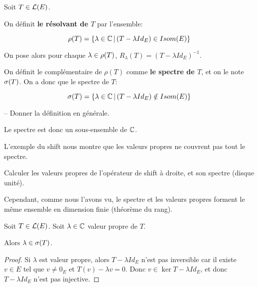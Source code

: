 \begin{definition}
	Soit $T \in \mathcal{L}(E)$.

	On définit \textbf{le résolvant de $T$} par l'ensemble:

	\begin{equation}
		\rho(T) = \left\{\lambda \in \mathbb{C} \, | \, (T - \lambda
			{Id}_{E}) \in Isom(E) \right\}
			\label{def:resolvant_operator}
	\end{equation}

	On pose alors pour chaque $\lambda \in \rho(T)$, $R_{\lambda}(T) = (T -
	\lambda Id_{E})^{-1}$.

	On définit le complémentaire de $\rho(T)$ comme \textbf{le spectre de $T$},
	et on le note $\sigma(T)$.
	On a donc que le spectre de $T$:

	\begin{equation}
		\sigma(T) = \left\{\lambda \in \mathbb{C} \, | \, (T - \lambda {Id}_{E})
		\notin Isom(E) \right\}
		\label{def:spectrum_operator}
	\end{equation}
\end{definition}

-- Donner la définition en générale.

Le spectre est donc un sous-ensemble de $\mathbb{C}$.

L'exemple du shift nous montre que les valeurs propres ne couvrent pas tout le
spectre.

\begin{exercice}
	Calculer les valeurs propres de l'opérateur de shift à droite, et son
	spectre (disque unité).
\end{exercice}

Cependant, comme nous l'avons vu, le spectre et les valeurs propres forment le
même ensemble en dimension finie (théorème du rang).

\begin{proposition}
	Soit $T \in \mathcal{L}(E)$.
	Soit $\lambda \in \mathbb{C}$ valeur propre de $T$.

	Alors $\lambda \in \sigma(T)$.
\end{proposition}

\begin{proof}
	Si $\lambda$ est valeur propre, alors $T - \lambda Id_{E}$ n'est pas
	inversible car il existe $v \in E$ tel que $v \neq 0_{E}$ et $T(v) - \lambda
	v = 0$. Donc $v \in \ker{T - \lambda Id_{E}}$, et donc $T - \lambda Id_{E}$
	n'est pas injective.
\end{proof}

